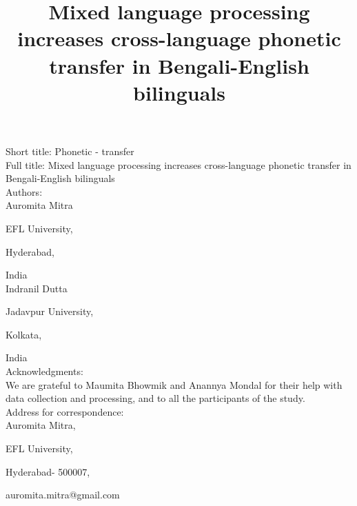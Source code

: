 \documentclass[12 pt]{article}
\title{Mixed language processing increases cross-language phonetic transfer in Bengali-English bilinguals}
\newlength\mystoreparindent
\newenvironment{myparindent}[1]{%
	\setlength{\mystoreparindent}{\the\parindent}
	\setlength{\parindent}{#1}
}{%
	\setlength{\parindent}{\mystoreparindent}
}
\begin{document}



\begin{singlespace}

\begin{myparindent}{0pt}
Short title: Phonetic - transfer\\

Full title: Mixed language processing increases cross-language phonetic transfer in Bengali-English bilinguals\\

Authors:\\

Auromita Mitra

EFL University,

Hyderabad,

India\\

Indranil Dutta

Jadavpur University,

Kolkata,

India\\

Acknowledgments:\\
We are grateful to Maumita Bhowmik and Anannya Mondal for their help with data collection and processing, and to all the participants of the study.\\
 

Address for correspondence:\\
Auromita Mitra,

EFL University,

Hyderabad- 500007,

auromita.mitra@gmail.com

\end{myparindent}

\end{singlespace}
\end{document}
